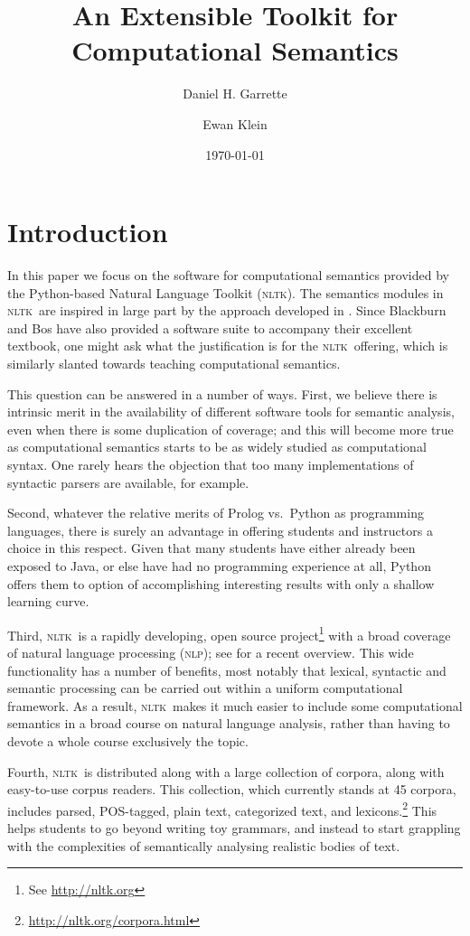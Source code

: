 \documentclass[11pt, a4paper]{article}
\newcommand{\NLP}{\textsc{nlp}}
\newcommand{\NLTK}{\textsc{nltk}}
\begin{document}
\title{An Extensible Toolkit for Computational Semantics}
\author{Daniel H. Garrette \and Ewan Klein}
\date{\today}
\maketitle

\section{Introduction}

In this paper we focus on the software for computational semantics provided
by the Python-based Natural Language Toolkit (\NLTK). The semantics
modules in \NLTK\ are
inspired in large part by the approach developed in \citet{BB}.
Since Blackburn and Bos have also provided a software suite to
accompany their excellent textbook, one might ask what the
justification is for the \NLTK\ offering, which is similarly slanted
towards teaching computational semantics.

This question can be answered in a number of ways. First, we believe
there is intrinsic merit in the availability of different software
tools for semantic analysis, even when there is some duplication of
coverage; and this will become more true as computational semantics
starts to be as widely studied as computational syntax. One rarely
hears the objection that too many implementations of syntactic
parsers are available, for example.

Second, whatever the relative merits of Prolog vs.\ Python as
programming languages, there is surely an advantage in offering
students and instructors a choice in this respect. Given that many
students have either already been exposed to Java, or else have had no
programming experience at all, Python offers them to option of
accomplishing interesting results with only a shallow
learning curve.

Third, \NLTK\ is a rapidly developing, open source
project\footnote{See \url{http://nltk.org}} with a broad coverage of
natural language processing (\NLP); see \citet{Multidisciplinary} for
a recent overview. This wide functionality has a number of benefits,
most notably that lexical, syntactic and semantic processing can be
carried out within a uniform computational framework. As a result,
\NLTK\ makes it much easier to include some computational semantics in
a broad course on natural language analysis, rather than having to
devote a whole course exclusively the topic.

Fourth, \NLTK\ is distributed along with a large collection of
corpora, along with easy-to-use corpus readers.  This collection,
which currently stands at 45 corpora, includes parsed, POS-tagged,
plain text, categorized text, and
lexicons.\footnote{\url{http://nltk.org/corpora.html}} This helps
students to go beyond writing toy grammars, and instead to start 
grappling with the complexities of semantically analysing realistic
bodies of text.
\end{document}
